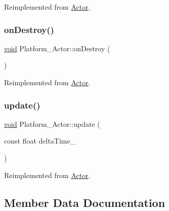 Reimplemented from \hyperlink{classActor_a56a241c949adf52cedceb45a7102ea1a}{Actor}.

\mbox{\label{classPlatform__Actor_a34b915aa583cdf659ec29368b6feb7e8}} 
\subsubsection{\texorpdfstring{on\+Destroy()}{onDestroy()}}
{\footnotesize\ttfamily \hyperlink{imgui__impl__opengl3__loader_8h_ac668e7cffd9e2e9cfee428b9b2f34fa7}{void} Platform\+\_\+\+Actor\+::on\+Destroy (\begin{DoxyParamCaption}{ }\end{DoxyParamCaption})\hspace{0.3cm}{\ttfamily [virtual]}}



Reimplemented from \hyperlink{classActor_a47101d6275509662bf6c84c3f3439696}{Actor}.

\mbox{\label{classPlatform__Actor_a12b22d88efc384ac35060d04fbbe710d}} 
\subsubsection{\texorpdfstring{update()}{update()}}
{\footnotesize\ttfamily \hyperlink{imgui__impl__opengl3__loader_8h_ac668e7cffd9e2e9cfee428b9b2f34fa7}{void} Platform\+\_\+\+Actor\+::update (\begin{DoxyParamCaption}\item[{const float}]{delta\+Time\+\_\+ }\end{DoxyParamCaption})\hspace{0.3cm}{\ttfamily [virtual]}}



Reimplemented from \hyperlink{classActor_a724ff8f2e9c34f15a6c443a3912504c4}{Actor}.



\subsection{Member Data Documentation}
\mbox{\label{classPlatform__Actor_a9c2b5cc9723cdc0b6a64b1b8fbedf548}} 
